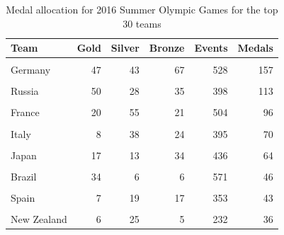 \documentclass[
]{article}
\begin{document}
\begin{table}[H]
\centering
\caption{\label{tab:SummerBreakDownWinners2}Medal allocation for 2016 Summer Olympic Games for the top 30 teams}
\centering
\fontsize{7}{9}\selectfont
\begin{tabular}[t]{lrrrrr}
\toprule
Team & Gold & Silver & Bronze & Events & Medals\\
\midrule
\cellcolor{gray!10}{United States} & \cellcolor{gray!10}{137} & \cellcolor{gray!10}{52} & \cellcolor{gray!10}{67} & \cellcolor{gray!10}{699} & \cellcolor{gray!10}{256}\\
Germany & 47 & 43 & 67 & 528 & 157\\
\cellcolor{gray!10}{Great Britain} & \cellcolor{gray!10}{64} & \cellcolor{gray!10}{55} & \cellcolor{gray!10}{26} & \cellcolor{gray!10}{470} & \cellcolor{gray!10}{145}\\
Russia & 50 & 28 & 35 & 398 & 113\\
\cellcolor{gray!10}{China} & \cellcolor{gray!10}{44} & \cellcolor{gray!10}{30} & \cellcolor{gray!10}{35} & \cellcolor{gray!10}{483} & \cellcolor{gray!10}{109}\\
\addlinespace
France & 20 & 55 & 21 & 504 & 96\\
\cellcolor{gray!10}{Australia} & \cellcolor{gray!10}{23} & \cellcolor{gray!10}{34} & \cellcolor{gray!10}{25} & \cellcolor{gray!10}{510} & \cellcolor{gray!10}{82}\\
Italy & 8 & 38 & 24 & 395 & 70\\
\cellcolor{gray!10}{Canada} & \cellcolor{gray!10}{4} & \cellcolor{gray!10}{4} & \cellcolor{gray!10}{61} & \cellcolor{gray!10}{397} & \cellcolor{gray!10}{69}\\
Japan & 17 & 13 & 34 & 436 & 64\\
\addlinespace
\cellcolor{gray!10}{Serbia} & \cellcolor{gray!10}{14} & \cellcolor{gray!10}{27} & \cellcolor{gray!10}{13} & \cellcolor{gray!10}{127} & \cellcolor{gray!10}{54}\\
Brazil & 34 & 6 & 6 & 571 & 46\\
\cellcolor{gray!10}{Netherlands} & \cellcolor{gray!10}{9} & \cellcolor{gray!10}{25} & \cellcolor{gray!10}{11} & \cellcolor{gray!10}{321} & \cellcolor{gray!10}{45}\\
Spain & 7 & 19 & 17 & 353 & 43\\
\cellcolor{gray!10}{Denmark} & \cellcolor{gray!10}{15} & \cellcolor{gray!10}{10} & \cellcolor{gray!10}{16} & \cellcolor{gray!10}{143} & \cellcolor{gray!10}{41}\\
\addlinespace
New Zealand & 6 & 25 & 5 & 232 & 36\\

\end{tabular}
\end{table}
\end{document}

